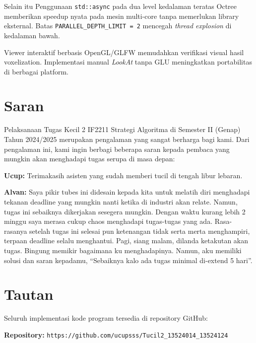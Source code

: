 \documentclass[12pt, a4paper]{report}
\begin{document}
Selain itu Penggunaan \texttt{std::async} pada dua level kedalaman teratas Octree
memberikan speedup nyata pada mesin multi-core tanpa memerlukan library
eksternal. Batas \texttt{PARALLEL\_DEPTH\_LIMIT = 2} mencegah
\textit{thread explosion} di kedalaman bawah.

Viewer interaktif berbasis OpenGL/GLFW memudahkan verifikasi visual hasil
voxelization. Implementasi manual \textit{LookAt} tanpa GLU meningkatkan
portabilitas di berbagai platform.


\section{Saran}
Pelaksanaan Tugas Kecil 2 IF2211 Strategi Algoritma di Semester II (Genap)
Tahun 2024/2025 merupakan pengalaman yang sangat berharga bagi kami. Dari
pengalaman ini, kami ingin berbagi beberapa saran kepada pembaca yang mungkin
akan menghadapi tugas serupa di masa depan:
\begin{infobox}
\textbf{Ucup:}
Terimakasih asisten yang sudah memberi tucil di tengah libur lebaran.
\end{infobox}

\begin{infobox}
\textbf{Alvan:} Saya pikir tubes ini didesain kepada kita untuk melatih
diri menghadapi tekanan deadline yang mungkin nanti ketika di industri
akan relate. Namun, tugas ini sebaiknya dikerjakan sesegera mungkin.
Dengan waktu kurang lebih 2 minggu saya merasa cukup chaos menghadapi
tugas-tugas yang ada. Rasa-rasanya setelah tugas ini selesai pun
ketenangan tidak serta merta menghampiri, terpaan deadline selalu
menghantui. Pagi, siang malam, dilanda ketakutan akan tugas. Bingung
memikir bagaimana ku menghadapinya. Namun, aku memiliki solusi dan saran
kepadamu, ``Sebaiknya kalo ada tugas minimal di-extend 5 hari''.
\end{infobox}

\section{Tautan}

Seluruh implementasi kode program tersedia di repository GitHub:

\begin{infobox}
\textbf{Repository:}
\texttt{https://github.com/ucupsss/Tucil2\_13524014\_13524124}

\end{infobox}
\end{document}
